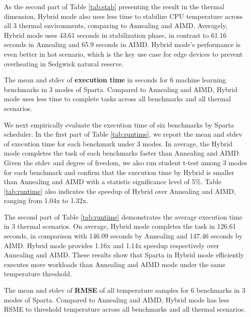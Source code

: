 As the second part of Table \ref{tab:stab} presenting the result in the thermal dimension, Hybrid mode also uses less time to stabilize CPU temperature across all 3 thermal environments, comparing to Annealing and AIMD. Averagely, Hybrid mode uses 43.61 seconds in stabilization phase, in contrast to 61.16 seconds in Annealing and 65.9 seconds in AIMD. Hybrid mode's performance is even better in hot scenario, which is the key use case for edge devices to prevent overheating in Sedgwick natural reserve.

\begin{table}[t]
\caption{The mean and stdev of \textbf{execution time} in seconds for 6 machine learning benchmarks in 3 modes of Sparta. Compared to Annealing and AIMD, Hybrid mode uses less time to complete tasks across all benchmarks and all thermal scenarios. }\label{tab:runtime}
\vspace{1mm}
\centering
\resizebox{350pt}{!}{}
\newline
\vspace{3mm}
\newline
\resizebox{300pt}{!}{}
\end{table}


We next empirically evaluate the execution time of six benchmarks by Sparta scheduler. In the first part of Table \ref{tab:runtime}, we report the mean and stdev of execution time for each benchmark under 3 modes. In average, the Hybrid mode completes the task of each benchmarks faster than Annealing and AIMD. Given the stdev and degree of freedom, we also run student t-test among 3 modes for each benchmark and confirm that the execution time by Hybrid is smaller than Annealing and AIMD with a statistic significance level of 5\%. Table \ref{tab:runtime} also indicates the speedup of Hybrid over Annealing and AIMD, ranging from 1.04x to 1.32x. 

The second part of Table \ref{tab:runtime} demonstrates the average execution time in 3 thermal scenarios. On average, Hybrid mode completes the task in 126.61 seconds, in comparison with 146.09 seconds by Annealing and 147.46 seconds by AIMD. Hybrid mode provides 1.16x and 1.14x speedup respectively over Annealing and AIMD. These results show that Sparta in Hybrid mode efficiently executes more workloads than Annealing and AIMD mode under the same temperature threshold. 



\begin{table}[t]
\caption{The mean and stdev of \textbf{RMSE} of all temperature samples for 6 benchmarks in 3 modes of Sparta. Compared to Annealing and AIMD, Hybrid mode has less RSME to threshold temperature across all benchmarks and all thermal scenarios.}\label{tab:rsme}
\vspace{1mm}
\centering
\resizebox{350pt}{!}{}
\newline
\vspace{3mm}
\newline
\resizebox{300pt}{!}{}
\end{table}


